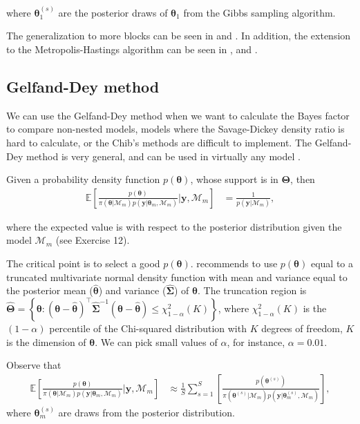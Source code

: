 where $\bm{\theta}^{(s)}_1$ are the posterior draws of $\bm{\theta}_1$ from the Gibbs sampling algorithm. 

The generalization to more blocks can be seen in \cite{chib1995marginal} and \cite[Chap.~7]{greenberg2012introduction}. In addition, the extension to the Metropolis-Hastings algorithm can be seen in \cite{chib2001marginal}, and \cite[Chap.~7]{greenberg2012introduction}.

\subsection{Gelfand-Dey method}\label{sec10_4_3}
We can use the Gelfand-Dey method \cite{gelfand1994bayesian} when we want to calculate the Bayes factor to compare non-nested models, models where the Savage-Dickey density ratio is hard to calculate, or the Chib's methods are difficult to implement. The Gelfand-Dey method is very general, and can be used in virtually any model \cite[Chap.~5]{koop2003bayesian}.

Given a probability density function $p(\bm{\theta})$, whose support is in $\bm{\Theta}$, then
\begin{align*}
	\mathbb{E}\left[\frac{p(\bm{\theta})}{\pi(\bm{\theta}|\mathcal{M}_m)p(\bm{y}|\bm{\theta}_m,\mathcal{M}_m)}\biggr\rvert \bm{y},\mathcal{M}_m\right]&=\frac{1}{p(\bm{y}|\mathcal{M}_m)},
\end{align*} 

where the expected value is with respect to the posterior distribution given the model $\mathcal{M}_m$ (see Exercise 12).

The critical point is to select a good $p(\bm{\theta})$. \cite{geweke1999using} recommends to use $p(\bm{\theta})$ equal to a truncated multivariate normal density function with mean and variance equal to the posterior mean ($\hat{\bm{\theta}}$) and variance ($\hat{\bm{\Sigma}}$) of $\bm{\theta}$. The truncation region is $\hat{\bm{\Theta}}=\left\{\bm{\theta}:(\bm{\theta}-\hat{\bm{\theta}})^{\top}\hat{\bm{\Sigma}}^{-1}(\bm{\theta}-\hat{\bm{\theta}})\leq \chi_{1-\alpha}^2(K)\right\}$, where $\chi_{1-\alpha}^2(K)$ is the $(1-\alpha)$ percentile of the Chi-squared distribution with $K$ degrees of freedom, $K$ is the dimension of $\bm{\theta}$. We can pick small values of $\alpha$, for instance, $\alpha=0.01$.

Observe that 
\begin{align*}
	\mathbb{E}\left[\frac{p(\bm{\theta})}{\pi(\bm{\theta}|\mathcal{M}_m)p(\bm{y}|\bm{\theta}_m,\mathcal{M}_m)}\biggr\rvert \bm{y},\mathcal{M}_m\right]&\approx \frac{1}{S}\sum_{s=1}^S \left[\frac{p(\bm{\theta}^{(s)})}{\pi(\bm{\theta}^{(s)}|\mathcal{M}_m)p(\bm{y}|\bm{\theta}^{(s)}_m,\mathcal{M}_m)}\right],
\end{align*}
where $\bm{\theta}^{(s)}_m$ are draws from the posterior distribution.

